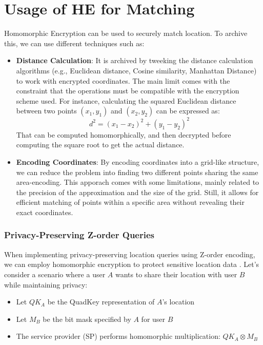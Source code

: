 \section{Usage of HE for Matching}
Homomorphic Encryption can be used to securely match location. To archive this, we can use different techniques such as:
\begin{itemize}
    \item \textbf{Distance Calculation}: It is archived by tweeking the distance calculation algorithms (e.g., Euclidean distance, Cosine similarity, Manhattan Distance) to work with encrypted coordinates. The main limit comes with the constraint that the operations must be compatible with the encryption scheme used. For instance, calculating the squared Euclidean distance between two points \( (x_1, y_1) \) and \( (x_2, y_2) \) can be expressed as:
    \[
        d^2 = (x_1 - x_2)^2 + (y_1 - y_2)^2
    \]
    That can be computed homomorphically, and then decrypted before computing the square root to get the actual distance.
    \item \textbf{Encoding Coordinates}: By encoding coordinates into a grid-like structure, we can reduce the problem into finding two different points sharing the same area-encoding. This apporach comes with some limitations, mainly related to the precision of the approximation and the size of the grid. Still, it allows for efficient matching of points within a specific area without revealing their exact coordinates.
\end{itemize}

\subsubsection{Privacy-Preserving Z-order Queries}
When implementing privacy-preserving location queries using Z-order encoding, we can employ homomorphic encryption to protect sensitive location data \cite{zhang2020privacy}. Let's consider a scenario where a user \( A \) wants to share their location with user \( B \) while maintaining privacy:

\begin{itemize}
    \item Let \( QK_A \) be the QuadKey representation of \( A \)'s location
    \item Let \( M_B \) be the bit mask specified by \( A \) for user \( B \)
    \item The service provider (SP) performs homomorphic multiplication: \( QK_A \otimes M_B \)
\end{itemize}

